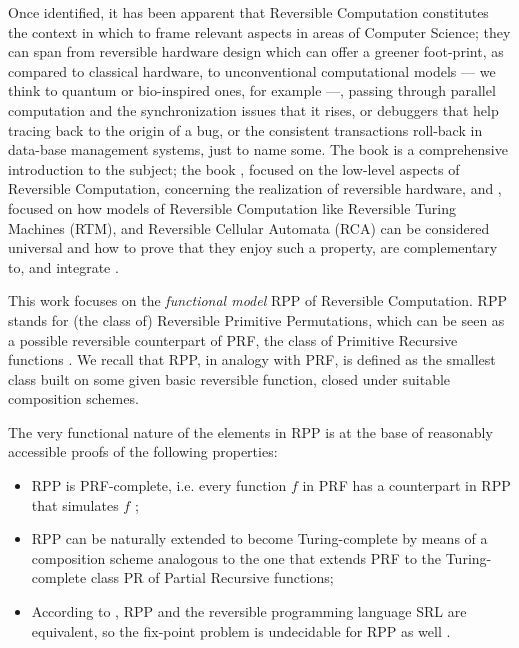 \documentclass[runningheads]{llncs}
\newcommand{\RPP}{\textsf{RPP}\xspace}
\newcommand{\PRF}{\textsf{PRF}\xspace}
\newcommand{\PR}{\textsf{PR}\xspace}
\newcommand{\SRL}{\textsf{SRL}\xspace}
\begin{document}
Once identified, it has been apparent that Reversible Computation constitutes the context in which to frame relevant aspects in areas of Computer Science; they can span from reversible hardware design which can offer a greener foot-print, as compared to classical hardware, to unconventional computational models --- we think to quantum or bio-inspired ones, for example ---, passing through parallel computation and the synchronization issues that it rises, or debuggers that help tracing back to the origin of a bug, or the consistent transactions roll-back in data-base management systems, just to name some. The book \cite{perumalla2013chc} is a comprehensive introduction to the subject; the book \cite{DBLP:books/daglib/0025734}, focused on the low-level aspects of Reversible Computation, concerning the realization of reversible hardware, and
\cite{DBLP:series/eatcs/Morita17}, focused on how models of Reversible Computation like Reversible Turing Machines (RTM), and Reversible Cellular Automata (RCA) can be considered universal and how to prove that they enjoy such a property, are complementary to, and integrate \cite{perumalla2013chc}.

This work focuses on the \emph{functional model} \RPP \cite{DBLP:journals/tcs/PaoliniPR20} of Reversible Computation.
\RPP stands for (the class of) Reversible Primitive Permutations, which can be seen as a possible reversible counterpart of \PRF, the class of Primitive Recursive functions \cite{rogers1967theory}.
We recall that \RPP, in analogy with \PRF, is defined as the smallest class built on some given basic reversible function, closed under suitable composition schemes.

The very functional nature of the elements in \RPP is at the base of reasonably accessible proofs of the following properties:
\begin{itemize}
\item \RPP is \PRF-complete, i.e. every function $ f $ in \PRF has a counterpart in \RPP that simulates $ f $ \cite{DBLP:journals/tcs/PaoliniPR20};

\item \RPP can be naturally extended to become Turing-complete \cite{Paolini2018NGC} by means of a composition scheme analogous to the one that extends \PRF to the Turing-complete class \PR of Partial Recursive functions;

\item According to \cite{MatosRC2020}, \RPP and the reversible programming language \SRL \cite{matos03tcs} are equivalent, so the fix-point problem is undecidable for \RPP as well \cite{2318_1734164MatosPaoliniRoversiTCSICTCS18}.
\end{itemize}
\end{document}
